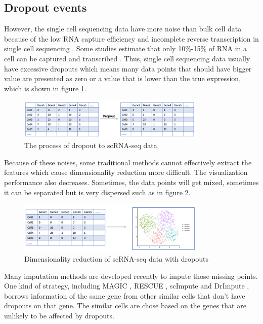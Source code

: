 \subsection{Dropout events}

However, the single cell sequencing data have more noise than bulk cell data because of the low RNA capture efficiency and incomplete reverse transcription in single cell sequencing \cite{Peng2019}. Some studies estimate that only 10\%-15\% of RNA in a cell can be captured and transcribed \cite{zheng2017massively}. Thus, single cell sequencing data usually have excessive dropouts which means many data points that should have bigger value are presented as zero or a value that is lower than the true expression, which is shown in figure \ref{dropout}.

\begin{figure}[htb!]
    \centering
    \includegraphics[width=0.8\textwidth]{figures/myfigures/dropout.png}
    \caption{The process of dropout to scRNA-seq data}
    \label{dropout}
\end{figure}

Because of these noises, some traditional methods cannot effectively extract the features which cause dimensionality reduction more difficult. The visualization performance also decreases. Sometimes, the data points will get mixed, sometimes it can be separated but is very dispersed such as in figure \ref{dr2}.

\begin{figure}[htb!]
    \centering
    \includegraphics[width=0.8\textwidth]{figures/myfigures/dr2.png}
    \caption{Dimensionality reduction of scRNA-seq data with dropouts}
    \label{dr2}
\end{figure}

Many imputation methods are developed recently to impute those missing points. One kind of strategy, including MAGIC \cite{van2017magic}, RESCUE \cite{Tracy2019}, scImpute \cite{Li2018} and DrImpute \cite{gong2018drimpute}, borrows information of the same gene from other similar cells that don't have dropouts on that gene. The similar cells are chose based on the genes that are unlikely to be affected by dropouts.

